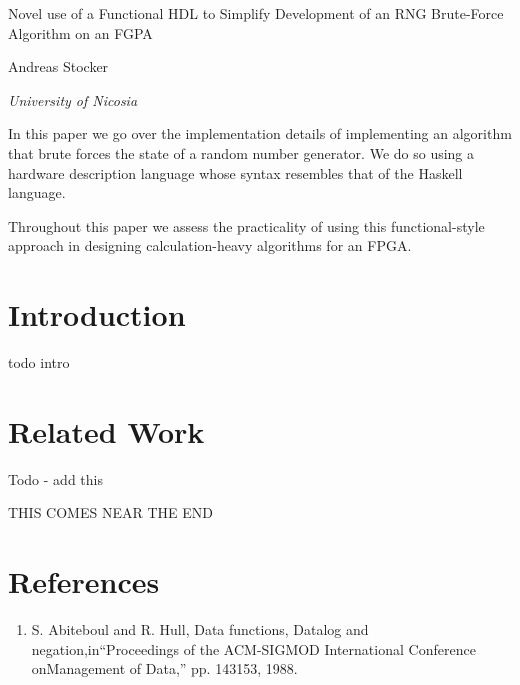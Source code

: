 \documentclass{article}
\begin{document}
    \begin{center}
    \end{center}
    
    \addvspace{20mm}
        
    \begin{center}
        \huge Novel use of a Functional HDL to Simplify Development of an RNG Brute-Force Algorithm on an FGPA
    \end{center}
    
    \begin{center}
    \end{center}
       
    \begin{center}
        \large Andreas Stocker
    \end{center}
    
    \begin{center}
        \small \emph {University of Nicosia}
    \end{center}

    \addvspace{15mm}

    \begin{multicols}{2}


    In this paper we go over the implementation details of implementing an algorithm that brute forces
    the state of a random number generator. We do so using a hardware description language whose syntax
    resembles that of the Haskell language.

    Throughout this paper we assess the practicality of using this functional-style approach in
    designing calculation-heavy algorithms for an FPGA.
        

    \section{Introduction}

    todo intro
    
    \section{Related Work}

    Todo - add this

    THIS COMES NEAR THE END

    
    \end{multicols}

    \break
    \section*{References}

    \begin{enumerate}

    \item S.  Abiteboul  and  R.  Hull,  Data  functions,  Datalog  and  negation,in``Proceedings  of  the  ACM-SIGMOD  International  Conference  onManagement of Data,'' pp. 143153, 1988.

    \end{enumerate}
    
\end{document}
